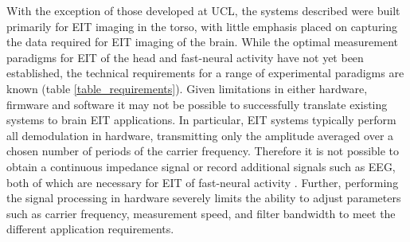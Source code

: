 With the exception of those developed at UCL, the systems described were built primarily for EIT imaging in the torso, with little emphasis placed on capturing the data required for EIT imaging of the brain. While the optimal measurement paradigms for EIT of the head and fast-neural activity have not yet been established, the technical requirements for a range of experimental paradigms are known (table \ref{table_requirements}). Given limitations in either hardware, firmware and software it may not be possible to successfully translate existing systems to brain EIT applications. In particular, EIT systems typically perform all demodulation in hardware, transmitting only the amplitude averaged over a chosen number of periods of the carrier frequency. Therefore it is not possible to obtain a continuous impedance signal or record additional signals such as EEG, both of which are necessary for EIT of fast-neural activity \cite{Aristovich_2016}. Further, performing the signal processing in hardware severely limits the ability to adjust parameters such as carrier frequency, measurement speed, and filter bandwidth to meet the different application requirements.